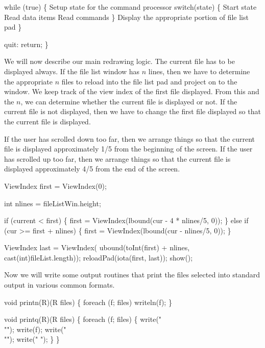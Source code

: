   while (true) \{
    \LA{}Setup state for the command processor\RA{}
    switch(state) \{
      \LA{}Start state\RA{}
      \LA{}Read data items\RA{}
      \LA{}Read commands\RA{}
    \}
    \LA{}Display the appropriate portion of file list pad\RA{}
  \}

quit: return;
\}

\nwendcode{}We will now describe our main redrawing logic. The current file has
to be displayed always. If the file list window has $n$ lines, then we
have to determine the appropriate $n$ files to reload into the file
list pad and project on to the window. We keep track of the view index
of the first file displayed. From this and the $n$, we can determine
whether the current file is displayed or not. If the current file is
not displayed, then we have to change the first file displayed so that
the current file is displayed.

If the user has scrolled down too far, then we arrange things so that
the current file is displayed approximately 1/5 from the beginning of
the screen. If the user has scrolled up too far, then we arrange
things so that the current file is displayed approximately 4/5 from
the end of the screen.

\nwenddocs{}\plusendmoddef\nwstartdeflinemarkup\nwenddeflinemarkup
ViewIndex first = ViewIndex(0);

\nwendcode{}\endmoddef\nwstartdeflinemarkup\nwenddeflinemarkup
int nlines = fileListWin.height;

if (current < first) \{
  first = ViewIndex(lbound(cur - 4 * nlines/5, 0));
\} else if (cur >= first + nlines) \{
  first = ViewIndex(lbound(cur - nlines/5, 0));
\}

ViewIndex last = ViewIndex(
  ubound(toInt(first) + nlines,
         cast(int)fileList.length));
reloadPad(iota(first, last));
show();

\nwendcode{}Now we will write some output routines that print the files selected
into standard output in various common formats.

\nwenddocs{}\endmoddef\nwstartdeflinemarkup\nwenddeflinemarkup
void printn(R)(R files)
\{
  foreach (f; files) writeln(f);
\}

void printq(R)(R files)
\{
  foreach (f; files) \{
    write("\\""); write(f); write("\\"");
    write(" ");
  \}
\}

